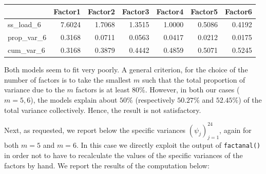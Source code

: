 \documentclass[
]{article}
\newenvironment{Shaded}{\begin{snugshade}}{\end{snugshade}}
\newcommand{\NormalTok}[1]{#1}
\newcommand{\OtherTok}[1]{\textcolor[rgb]{0.56,0.35,0.01}{#1}}
\newcommand{\SpecialCharTok}[1]{\textcolor[rgb]{0.81,0.36,0.00}{\textbf{#1}}}
\theoremstyle{plain}
\begin{document}
\begin{longtable}[]{@{}lrrrrrr@{}}
\toprule\noalign{}
& Factor1 & Factor2 & Factor3 & Factor4 & Factor5 & Factor6 \\
\midrule\noalign{}
\endhead
\bottomrule\noalign{}
\endlastfoot
ss\_load\_6 & 7.6024 & 1.7068 & 1.3515 & 1.0000 & 0.5086 & 0.4192 \\
prop\_var\_6 & 0.3168 & 0.0711 & 0.0563 & 0.0417 & 0.0212 & 0.0175 \\
cum\_var\_6 & 0.3168 & 0.3879 & 0.4442 & 0.4859 & 0.5071 & 0.5245 \\
\end{longtable}

Both models seem to fit very poorly. A general criterion, for the choice
of the number of factors is to take the smallest \(m\) such that the
total proportion of variance due to the \(m\) factors is at least
\(80\%\). However, in both our cases (\(m = 5, 6\)), the models explain
about \(50\%\) (respectively \(50.27\%\) and \(52.45\%\)) of the total
variance collectively. Hence, the result is not satisfactory.

Next, as requested, we report below the specific variances
\((\psi_j)_{j = 1}^{24}\), again for both \(m = 5\) and \(m = 6\). In
this case we directly exploit the output of \texttt{factanal()} in order
not to have to recalculate the values of the specific variances of the
factors by hand. We report the results of the computation below:

\smallskip

\begin{Shaded}
\end{Shaded}
\end{document}
